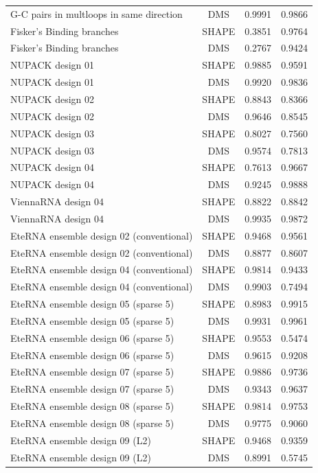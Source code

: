 \documentclass[letter]{bioinfo}
\begin{document}
\begin{center}
\begin{longtable}{lccc}
G-C pairs in multloops in same direction	&	DMS	&	0.9991 	&	0.9866 	\\
Fisker's Binding branches	&	SHAPE	&	0.3851 	&	0.9764 	\\
Fisker's Binding branches	&	DMS	&	0.2767 	&	0.9424 	\\
NUPACK design 01	&	SHAPE	&	0.9885 	&	0.9591 	\\
NUPACK design 01	&	DMS	&	0.9920 	&	0.9836 	\\
NUPACK design 02	&	SHAPE	&	0.8843 	&	0.8366 	\\
NUPACK design 02	&	DMS	&	0.9646 	&	0.8545 	\\
NUPACK design 03	&	SHAPE	&	0.8027 	&	0.7560 	\\
NUPACK design 03	&	DMS	&	0.9574 	&	0.7813 	\\
NUPACK design 04	&	SHAPE	&	0.7613 	&	0.9667 	\\
NUPACK design 04	&	DMS	&	0.9245 	&	0.9888 	\\
ViennaRNA design 04	&	SHAPE	&	0.8822 	&	0.8842 	\\
ViennaRNA design 04	&	DMS	&	0.9935 	&	0.9872 	\\
EteRNA ensemble design 02 (conventional)	&	SHAPE	&	0.9468 	&	0.9561 	\\
EteRNA ensemble design 02 (conventional)	&	DMS	&	0.8877 	&	0.8607 	\\
EteRNA ensemble design 04 (conventional)	&	SHAPE	&	0.9814 	&	0.9433 	\\
EteRNA ensemble design 04 (conventional)	&	DMS	&	0.9903 	&	0.7494 	\\
EteRNA ensemble design 05 (sparse 5)	&	SHAPE	&	0.8983 	&	0.9915 	\\
EteRNA ensemble design 05 (sparse 5)	&	DMS	&	0.9931 	&	0.9961 	\\
EteRNA ensemble design 06 (sparse 5)	&	SHAPE	&	0.9553 	&	0.5474 	\\
EteRNA ensemble design 06 (sparse 5)	&	DMS	&	0.9615 	&	0.9208 	\\
EteRNA ensemble design 07 (sparse 5)	&	SHAPE	&	0.9886 	&	0.9736 	\\
EteRNA ensemble design 07 (sparse 5)	&	DMS	&	0.9343 	&	0.9637 	\\
EteRNA ensemble design 08 (sparse 5)	&	SHAPE	&	0.9814 	&	0.9753 	\\
EteRNA ensemble design 08 (sparse 5)	&	DMS	&	0.9775 	&	0.9060 	\\
EteRNA ensemble design 09 (L2)	&	SHAPE	&	0.9468 	&	0.9359 	\\
EteRNA ensemble design 09 (L2)	&	DMS	&	0.8991 	&	0.5745 	\\

\end{longtable}
\end{center}
\end{document}
